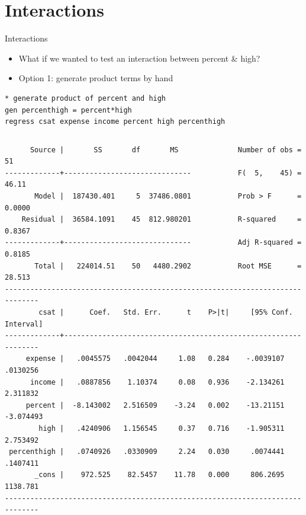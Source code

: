 \documentclass[table,smaller]{beamer}
\begin{document}
\section{Interactions}
\label{sec-4}

\begin{frame}[fragile,label=sec-4-1]{Interactions}
 \begin{itemize}
\item What if we wanted to test an interaction between percent \& high?
\item Option 1: generate product terms by hand
\end{itemize}


\begin{verbatim}
* generate product of percent and high
gen percenthigh = percent*high 
regress csat expense income percent high percenthigh
\end{verbatim}

\vspace{-.5em}
\begin{columns}
\begin{block}{}
\begin{verbatim}
      Source |       SS       df       MS              Number of obs =      51
-------------+------------------------------           F(  5,    45) =   46.11
       Model |  187430.401     5  37486.0801           Prob > F      =  0.0000
    Residual |  36584.1091    45  812.980201           R-squared     =  0.8367
-------------+------------------------------           Adj R-squared =  0.8185
       Total |   224014.51    50   4480.2902           Root MSE      =  28.513
------------------------------------------------------------------------------
        csat |      Coef.   Std. Err.      t    P>|t|     [95% Conf. Interval]
-------------+----------------------------------------------------------------
     expense |   .0045575   .0042044     1.08   0.284    -.0039107    .0130256
      income |   .0887856    1.10374     0.08   0.936    -2.134261    2.311832
     percent |  -8.143002   2.516509    -3.24   0.002    -13.21151   -3.074493
        high |   .4240906   1.156545     0.37   0.716    -1.905311    2.753492
 percenthigh |   .0740926   .0330909     2.24   0.030     .0074441    .1407411
       _cons |    972.525    82.5457    11.78   0.000     806.2695    1138.781
------------------------------------------------------------------------------
\end{verbatim}
\end{block}
\end{columns}
\vspace{.5em}
\end{frame}
\end{document}

